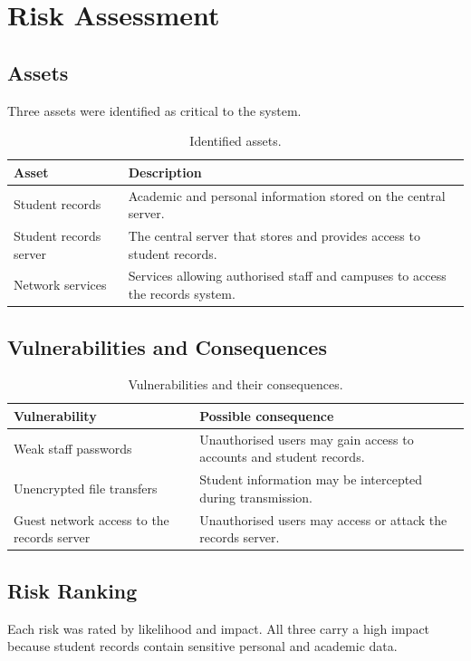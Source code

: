 \documentclass[11pt,a4paper]{article}
\begin{document}
\section{Risk Assessment}

\subsection{Assets}
Three assets were identified as critical to the system.

\begin{table}[h!]
\centering
\renewcommand{\arraystretch}{1.3}
\begin{tabular}{@{}l p{10.5cm}@{}}
\toprule
\textbf{Asset} & \textbf{Description} \\
\midrule
Student records & Academic and personal information stored on the central server. \\
Student records server & The central server that stores and provides access to student records. \\
Network services & Services allowing authorised staff and campuses to access the records system. \\
\bottomrule
\end{tabular}
\caption{Identified assets.}
\end{table}

\subsection{Vulnerabilities and Consequences}
\begin{table}[h!]
\centering
\renewcommand{\arraystretch}{1.3}
\begin{tabular}{@{}p{5cm} p{9cm}@{}}
\toprule
\textbf{Vulnerability} & \textbf{Possible consequence} \\
\midrule
Weak staff passwords & Unauthorised users may gain access to accounts and student records. \\
Unencrypted file transfers & Student information may be intercepted during transmission. \\
Guest network access to the records server & Unauthorised users may access or attack the records server. \\
\bottomrule
\end{tabular}
\caption{Vulnerabilities and their consequences.}
\end{table}

\subsection{Risk Ranking}
Each risk was rated by likelihood and impact. All three carry a high impact
because student records contain sensitive personal and academic data.
\end{document}
